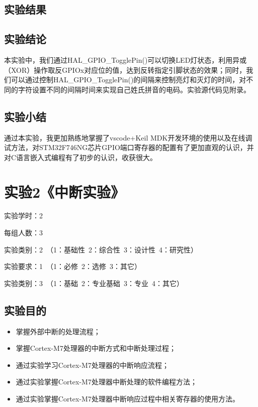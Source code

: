 ﻿\documentclass[UTF8,12pt]{article}
\begin{document}
\subsection{实验结果}

\subsection{实验结论}
本实验中，我们通过HAL\_GPIO\_TogglePin()可以切换LED灯状态，利用异或（XOR）操作取反GPIOx对应位的值，达到反转指定引脚状态的效果；同时，我们可以通过控制HAL\_GPIO\_TogglePin()的间隔来控制亮灯和灭灯的时间，对不同的字符设置不同的间隔时间来实现自己姓氏拼音的电码。实验源代码见附录。

\subsection{实验小结}
通过本实验，我更加熟练地掌握了vscode+Keil MDK开发环境的使用以及在线调试方法，对STM32F746NG芯片GPIO端口寄存器的配置有了更加直观的认识，并对C语言嵌入式编程有了初步的认识，收获很大。

\newpage


\section{实验2《中断实验》}

实验学时：2

每组人数：3

实验类别：2\ （1：基础性\ 2：综合性\ 3：设计性\ 4：研究性）

实验要求：1\ （1：必修\ 2：选修\ 3：其它）

实验类别：3\ （1：基础\ 2：专业基础\ 3：专业\ 4：其它）

\subsection{实验目的}
\begin{itemize}
  \item 掌握外部中断的处理流程；
  \item 掌握Cortex-M7处理器的中断方式和中断处理过程；
  \item 通过实验学习Cortex-M7处理器的中断响应流程；
  \item 通过实验掌握Cortex-M7处理器中断处理的软件编程方法；
  \item 通过实验掌握Cortex-M7处理器中断响应过程中相关寄存器的使用方法。
\end{itemize}
\end{document}
